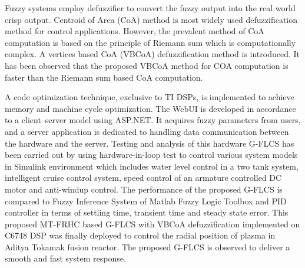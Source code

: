 \begin{abstracts}
	Fuzzy systems employ defuzzifier to convert the fuzzy output into the real world crisp output. Centroid of Area (CoA) method is most widely used defuzzification method for control applications. However, the prevalent method of CoA computation is based on the principle of Riemann sum which is computationally complex. A vertices based CoA (VBCoA) defuzzification method is introduced. It has been observed that the proposed VBCoA method for COA computation is faster than the Riemann sum based CoA computation.
	
	A code optimization technique, exclusive to TI DSPs, is implemented to achieve memory and machine cycle optimization. The WebUI is developed in accordance to a client--server model using ASP.NET. It acquires fuzzy parameters from users, and a server application is dedicated to handling data communication between the hardware and the server. Testing and analysis of this hardware G-FLCS has been carried out by using hardware-in-loop test to control various system models in Simulink environment which includes water level control in a two tank system, intelligent cruise control system, speed control of an armature controlled DC motor and anti-windup control. The performance of the proposed G-FLCS is compared to Fuzzy Inference System of Matlab Fuzzy Logic Toolbox and PID controller in terms of settling time, transient time and steady state error. This proposed MT-FRHC based G-FLCS with VBCoA defuzzification implemented on C6748 DSP was finally deployed to control the radial position of plasma in Aditya Tokamak fusion reactor. The proposed G-FLCS is observed to deliver a smooth and fast system response.
	
\end{abstracts}




